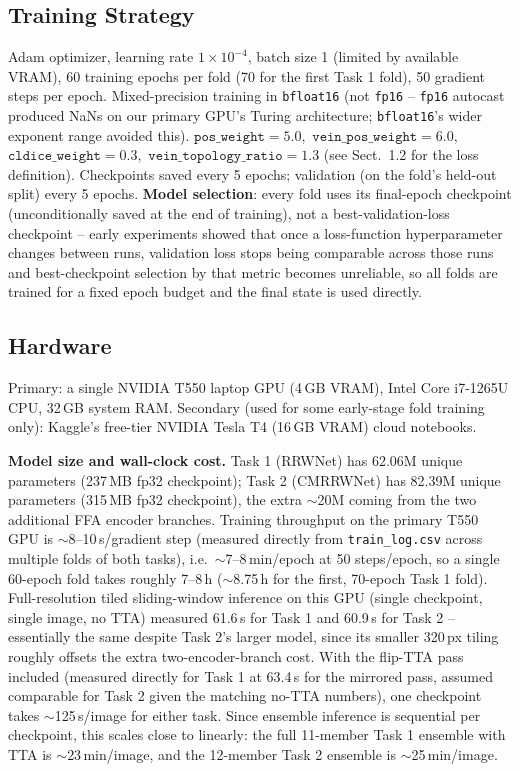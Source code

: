 \documentclass[runningheads]{llncs}
\begin{document}
\subsection{Training Strategy}
Adam optimizer, learning rate $1\times10^{-4}$, batch size 1 (limited by
available VRAM), 60 training epochs per fold (70 for the first Task 1 fold),
50 gradient steps per epoch. Mixed-precision training in \texttt{bfloat16}
(not \texttt{fp16} -- \texttt{fp16} autocast produced NaNs on our primary
GPU's Turing architecture; \texttt{bfloat16}'s wider exponent range avoided
this). $\texttt{pos\_weight}=5.0$,\allowbreak\ $\texttt{vein\_pos\_weight}=6.0$,\allowbreak\
$\texttt{cldice\_weight}=0.3$,\allowbreak\ $\texttt{vein\_topology\_ratio}=1.3$ (see
Sect.~1.2 for the loss definition). Checkpoints saved every 5 epochs;
validation (on the fold's held-out split) every 5 epochs. \textbf{Model
selection}: every fold uses its final-epoch checkpoint (unconditionally
saved at the end of training), not a best-validation-loss checkpoint --
early experiments showed that once a loss-function hyperparameter changes
between runs, validation loss stops being comparable across those runs
and best-checkpoint selection by that metric becomes unreliable, so all
folds are trained for a fixed epoch budget and the final state is used
directly.

\subsection{Hardware}
Primary: a single NVIDIA T550 laptop GPU (4\,GB VRAM), Intel Core
i7-1265U CPU, 32\,GB system RAM. Secondary (used for some early-stage fold
training only): Kaggle's free-tier NVIDIA Tesla T4 (16\,GB VRAM) cloud
notebooks.

\textbf{Model size and wall-clock cost.} Task 1 (RRWNet) has 62.06M unique
parameters (237\,MB fp32 checkpoint); Task 2 (CMRRWNet) has 82.39M unique
parameters (315\,MB fp32 checkpoint), the extra $\sim$20M coming from the
two additional FFA encoder branches. Training throughput on the primary
T550 GPU is
$\sim$8--10\,s/gradient step (measured directly from \texttt{train\_log.csv}
across multiple folds of both tasks), i.e.\ $\sim$7--8\,min/epoch at 50
steps/epoch, so a single 60-epoch fold takes roughly 7--8\,h ($\sim$8.75\,h
for the first, 70-epoch Task 1 fold). Full-resolution tiled sliding-window
inference on this GPU (single checkpoint, single image, no TTA) measured
61.6\,s for Task 1 and 60.9\,s for Task 2 -- essentially the same despite
Task 2's larger model, since its smaller 320\,px tiling roughly offsets the
extra two-encoder-branch cost. With the flip-TTA pass included (measured
directly for Task 1 at 63.4\,s for the mirrored pass, assumed comparable
for Task 2 given the matching no-TTA numbers), one checkpoint takes
$\sim$125\,s/image for either task. Since ensemble inference is sequential
per checkpoint, this scales close to linearly: the full 11-member Task 1
ensemble with TTA is $\sim$23\,min/image, and the 12-member Task 2 ensemble
is $\sim$25\,min/image.
\end{document}
